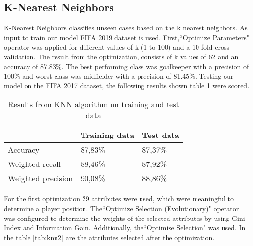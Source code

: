 \subsection{K-Nearest Neighbors}
\label{sec:KNN}
K-Nearest Neighbors classifies unseen cases based on the k nearest neighbors. As input to train our model FIFA 2019 dataset is used. First,``Optimize Parameters" operator was applied for different values of k (1 to 100) and a 10-fold cross validation. The result from the optimization, consists of k values of 62 and an accuracy of 87.83\%. The best performing class was goalkeeper with a precision of 100\% and worst class was midfielder with a precision of 81.45\%. Testing our model on the FIFA 2017 dataset, the following results shown table \ref{tab:knn} were scored.

\begin{table}[]
\centering
\begin{tabular}{@{}lll@{}}
\toprule
                   & Training data & Test data \\ \midrule
Accuracy           & 87,83\%       & 87,37\%   \\
Weighted recall    & 88,46\%       & 87,92\%   \\
Weighted precision & 90,08\%       & 88,86\%   \\ \bottomrule
\end{tabular}
\label{tab:knn}
\caption{Results from KNN algorithm on training and test data}
\end{table}
For the first optimization 29 attributes were used, which were meaningful to determine a player position.
The``Optimize Selection (Evolutionary)" operator was configured to determine the weights of the selected attributes by using Gini Index and Information Gain. Additionally, the``Optimize Selection" was used. In the table \ref{tab:knn2} are the attributes selected after the optimization.

